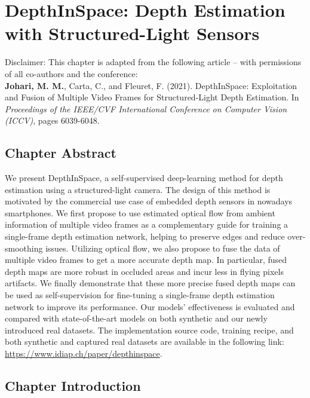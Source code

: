 \chapter{DepthInSpace: Depth Estimation with Structured-Light Sensors} \label{sec:chapter2}

\begin{tcolorbox}[colback=gray!20, boxrule=1pt, colframe=black]
  Disclaimer: This chapter is adapted from the following article – with permissions of all co-authors and the conference: \\

    \textbf{Johari, M. M.}, Carta, C., and Fleuret, F. (2021). DepthInSpace: Exploitation and Fusion of Multiple Video Frames for Structured-Light Depth Estimation. In \textit{Proceedings of the IEEE/CVF International Conference on Computer Vision (ICCV)}, pages 6039-6048.
\end{tcolorbox}

\section{Chapter Abstract}

We present DepthInSpace, a self-supervised deep-learning method for depth estimation using a structured-light camera. The design of this method is motivated by the commercial use case of embedded depth sensors in nowadays smartphones. We first propose to use estimated optical flow from ambient information of multiple video frames as a complementary guide for training a single-frame depth estimation network, helping to preserve edges and reduce over-smoothing issues. Utilizing optical flow, we also propose to fuse the data of multiple video frames to get a more accurate depth map. In particular, fused depth maps are more robust in occluded areas and incur less in flying pixels artifacts. We finally demonstrate that these more precise fused depth maps can be used as self-supervision for fine-tuning a single-frame depth estimation network to improve its performance. Our models' effectiveness is evaluated and compared with state-of-the-art models on both synthetic and our newly introduced real datasets. The implementation source code, training recipe, and both synthetic and captured real datasets are available in the following link: \href{https://www.idiap.ch/paper/depthinspace}{https://www.idiap.ch/paper/depthinspace}.

\section{Chapter Introduction}

